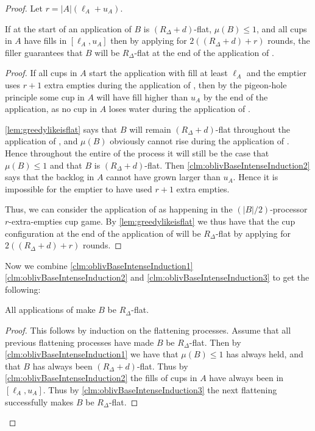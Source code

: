 \begin{proof}
Let $r = |A|(\ell_A + u_A)$.
\begin{clm}
  \label{clm:oblivBaseIntenseInduction3}
  If at the start of an application of \flatalg $B$ is $(R_\Delta
  + d)$-flat, $\mu(B) \le 1$, and all cups in $A$ have fills in
  $[\ell_A, u_A]$ then by applying \flatalg for $2((R_\Delta + d)
  + r)$ rounds, the filler guarantees that $B$ will be
  $R_\Delta$-flat at the end of the application of \flatalg. 
\end{clm}
\begin{proof}
  If all cups in $A$ start the application with fill at
  least $\ell_A$ and the emptier uses $r+1$ extra
  empties during the application of \flatalg, then by the
  pigeon-hole principle some cup in $A$
  will have fill higher than $u_A$ by the end of the application,
  as no cup in $A$ loses water during the application of \flatalg.
  
  \cref{lem:greedylikeisflat} says that $B$ will remain
  $(R_\Delta + d)$-flat throughout the application of \flatalg,
  and $\mu(B)$ obviously cannot rise during the application of
  \flatalg. Hence throughout the entire of the process it will still be the
  case that $\mu(B) \le 1$ and that $B$ is $(R_\Delta + d)$-flat.
  Then \cref{clm:oblivBaseIntenseInduction2} says that the
  backlog in $A$ cannot have grown larger than $u_A$. Hence it is
  impossible for the emptier to have used $r+1$ extra empties.

  Thus, we can consider the application of \flatalg as happening
  in the $(|B|/2)$-processor $r$-extra-empties cup game. By
  \cref{lem:greedylikeisflat} we thus have that the cup
  configuration at the end of the application of \flatalg will be
  $R_\Delta$-flat by applying \flatalg for $2((R_\Delta + d) +
  r)$ rounds.
\end{proof}

Now we combine \cref{clm:oblivBaseIntenseInduction1}
\cref{clm:oblivBaseIntenseInduction2} and
\cref{clm:oblivBaseIntenseInduction3} to get the following:
\begin{clm}
  All applications of \flatalg make $B$ be $R_\Delta$-flat.
 \end{clm}
\begin{proof}
  This follows by induction on the flattening processes. Assume
  that all previous flattening processes have made $B$ be
  $R_\Delta$-flat. Then by
  \cref{clm:oblivBaseIntenseInduction1} we have that $\mu(B) \le
  1$ has always held, and that $B$ has always been $(R_\Delta +
  d)$-flat. Thus by \cref{clm:oblivBaseIntenseInduction2} the
  fills of cups in $A$ have always been in $[\ell_A, u_A]$. Thus
  by \cref{clm:oblivBaseIntenseInduction3} the next flattening
  successfully makes $B$ be $R_\Delta$-flat.


\end{proof}
\end{proof}
